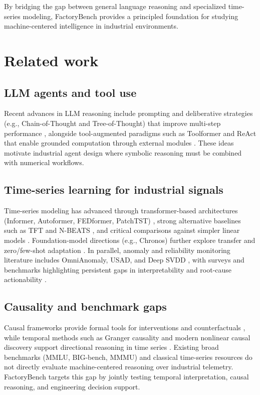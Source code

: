 \documentclass{article}
\begin{document}
By bridging the gap between general language reasoning and specialized time-series modeling, FactoryBench provides a principled foundation for studying machine-centered intelligence in industrial environments.

\section{Related work}

\subsection{LLM agents and tool use}

Recent advances in LLM reasoning include prompting and deliberative strategies (e.g., Chain-of-Thought and Tree-of-Thought) that improve multi-step performance \cite{wei2022chain,yao2023tree}, alongside tool-augmented paradigms such as Toolformer and ReAct that enable grounded computation through external modules \cite{schick2023toolformer,yao2023react,qin2023tool}. These ideas motivate industrial agent design where symbolic reasoning must be combined with numerical workflows.

\subsection{Time-series learning for industrial signals}

Time-series modeling has advanced through transformer-based architectures (Informer, Autoformer, FEDformer, PatchTST) \cite{zhou2021informer,wu2021autoformer,zhou2022fedformer,nie2023patchtst}, strong alternative baselines such as TFT and N-BEATS \cite{lim2021tft,oreshkin2020nbeats}, and critical comparisons against simpler linear models \cite{zeng2023transformers}. Foundation-model directions (e.g., Chronos) further explore transfer and zero/few-shot adaptation \cite{woo2024chronos,das2024survey}. In parallel, anomaly and reliability monitoring literature includes OmniAnomaly, USAD, and Deep SVDD \cite{su2019omni,audibert2020usad,ruff2018deep}, with surveys and benchmarks highlighting persistent gaps in interpretability and root-cause actionability \cite{chalapathy2019survey,lavin2015numenta}.

\subsection{Causality and benchmark gaps}

Causal frameworks provide formal tools for interventions and counterfactuals \cite{pearl2009causality,peters2017elements,rubin1974causal}, while temporal methods such as Granger causality and modern nonlinear causal discovery support directional reasoning in time series \cite{granger1969causal,runge2019causal}. Existing broad benchmarks (MMLU, BIG-bench, MMMU) \cite{hendrycks2021mmlu,srivastava2023bigbench,yue2024mmmu} and classical time-series resources \cite{laptev2015generic,dau2019ucr,wen2022transformers} do not directly evaluate machine-centered reasoning over industrial telemetry. FactoryBench targets this gap by jointly testing temporal interpretation, causal reasoning, and engineering decision support.
\end{document}
